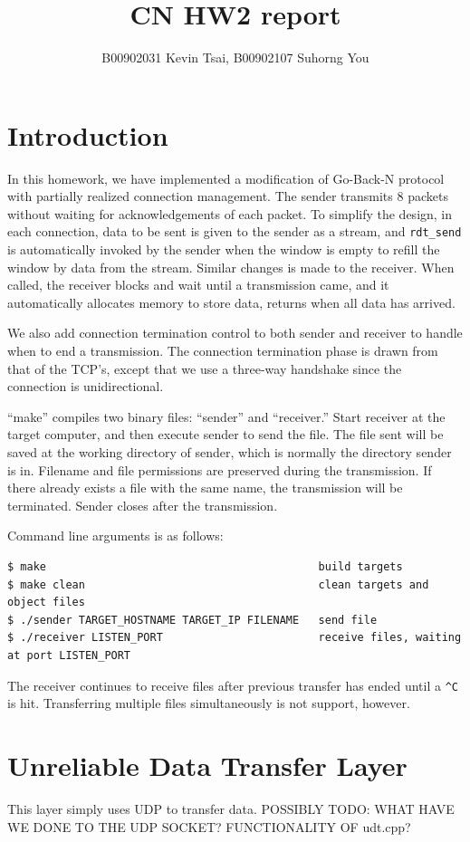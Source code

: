 \documentclass[10pt,a4paper]{article}
\author{B00902031 Kevin Tsai, B00902107 Suhorng You}
\title{CN HW2 report}
\begin{document}
\maketitle

\section{Introduction}
    In this homework, we have implemented a modification of Go-Back-N protocol with partially realized connection management. The sender transmits $8$ packets without waiting for acknowledgements of each packet. To simplify the design, in each connection, data to be sent is given to the sender as a stream, and \texttt{rdt\_send} is automatically invoked by the sender when the window is empty to refill the window by data from the stream. Similar changes is made to the receiver. When called, the receiver blocks and wait until a transmission came, and it automatically allocates memory to store data, returns when all data has arrived.

    We also add connection termination control to both sender and receiver to handle when to end a transmission. The connection termination phase is drawn from that of the TCP's, except that we use a three-way handshake since the connection is unidirectional.

    ``make'' compiles two binary files: ``sender'' and ``receiver.'' Start receiver at the target computer, and then execute sender to send the file. The file sent will be saved at the working directory of sender, which is normally the directory sender is in. Filename and file permissions are preserved during the transmission. If there already exists a file with the same name, the transmission will be terminated. Sender closes after the transmission.

    Command line arguments is as follows:
\begin{verbatim}
$ make											build targets
$ make clean									clean targets and object files
$ ./sender TARGET_HOSTNAME TARGET_IP FILENAME	send file
$ ./receiver LISTEN_PORT						receive files, waiting at port LISTEN_PORT
\end{verbatim}

    The receiver continues to receive files after previous transfer has ended until a \texttt{\^{}C} is hit. Transferring multiple files simultaneously is not support, however.
\section{Unreliable Data Transfer Layer}
    This layer simply uses UDP to transfer data.
    POSSIBLY TODO: WHAT HAVE WE DONE TO THE UDP SOCKET? FUNCTIONALITY OF udt.cpp?
\end{document}
